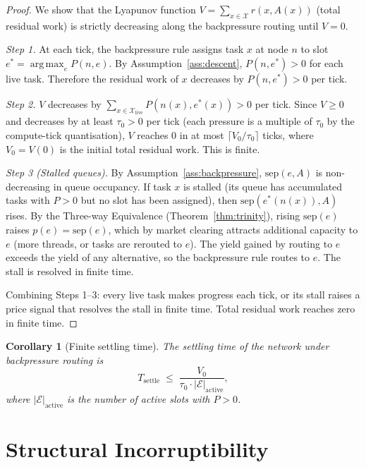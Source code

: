 \documentclass[11pt,twocolumn,a4paper]{article}
\theoremstyle{plain}
\newtheorem{corollary}[theorem]{Corollary}
\theoremstyle{definition}
\theoremstyle{remark}
\newcommand{\E}{\mathcal{E}}
\newcommand{\X}{\mathcal{X}}
\newcommand{\tick}{\tau_0}
\newcommand{\sep}{\mathrm{sep}}
\newcommand{\pres}{P}
\DeclareMathOperator*{\argmax}{arg\,max}
\begin{document}
\begin{proof}
We show that the Lyapunov function $V = \sum_{x \in \X} r(x, A(x))$ (total residual work) is strictly decreasing along the backpressure routing until $V = 0$.

\emph{Step 1.} At each tick, the backpressure rule assigns task $x$ at node $n$ to slot $e^* = \argmax_{e} \pres(n,e)$. By Assumption~\ref{ass:descent}, $\pres(n, e^*) > 0$ for each live task. Therefore the residual work of $x$ decreases by $\pres(n, e^*) > 0$ per tick.

\emph{Step 2.} $V$ decreases by $\sum_{x \in \X_{\mathrm{live}}} \pres(n(x), e^*(x)) > 0$ per tick. Since $V \geq 0$ and decreases by at least $\tick > 0$ per tick (each pressure is a multiple of $\tick$ by the compute-tick quantisation), $V$ reaches $0$ in at most $\lceil V_0 / \tick \rceil$ ticks, where $V_0 = V(0)$ is the initial total residual work. This is finite.

\emph{Step 3 (Stalled queues).} By Assumption~\ref{ass:backpressure}, $\sep(e, A)$ is non-decreasing in queue occupancy. If task $x$ is stalled (its queue has accumulated tasks with $\pres > 0$ but no slot has been assigned), then $\sep(e^*(n(x)), A)$ rises. By the Three-way Equivalence (Theorem~\ref{thm:trinity}), rising $\sep(e)$ raises $p(e) = \sep(e)$, which by market clearing attracts additional capacity to $e$ (more threads, or tasks are rerouted to $e$). The yield gained by routing to $e$ exceeds the yield of any alternative, so the backpressure rule routes to $e$. The stall is resolved in finite time.

Combining Steps 1--3: every live task makes progress each tick, or its stall raises a price signal that resolves the stall in finite time. Total residual work reaches zero in finite time.
\end{proof}

\begin{corollary}[Finite settling time]
\label{cor:settling}
The settling time of the network under backpressure routing is
\[
  T_{\mathrm{settle}} \;\leq\; \frac{V_0}{\tick \cdot |\E|_{\mathrm{active}}},
\]
where $|\E|_{\mathrm{active}}$ is the number of active slots with $\pres > 0$.
\end{corollary}

\section{Structural Incorruptibility}
\label{sec:incorruptibility}
\end{document}
